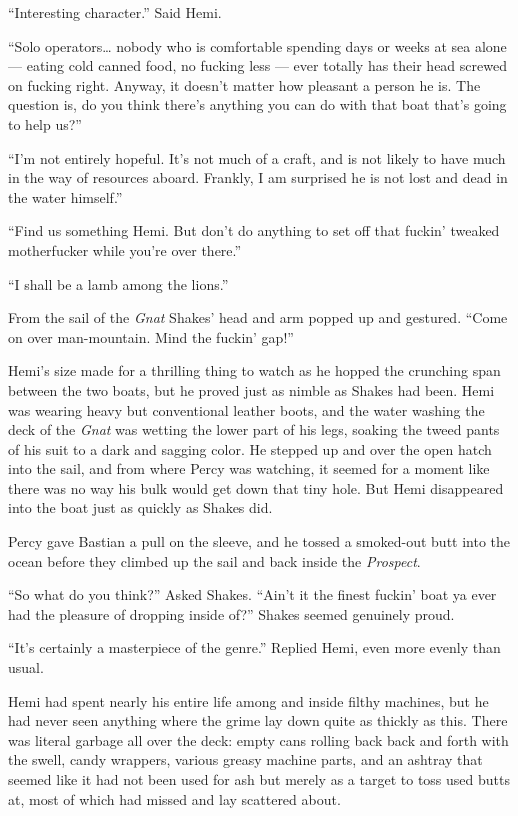 \documentclass[]{scrbook}
\begin{document}
``Interesting character.'' Said Hemi.

``Solo operators\ldots{} nobody who is comfortable spending days or
weeks at sea alone --- eating cold canned food, no fucking less --- ever
totally has their head screwed on fucking right. Anyway, it doesn't
matter how pleasant a person he is. The question is, do you think
there's anything you can do with that boat that's going to help us?''

``I'm not entirely hopeful. It's not much of a craft, and is not likely
to have much in the way of resources aboard. Frankly, I am surprised he
is not lost and dead in the water himself.''

``Find us something Hemi. But don't do anything to set off that fuckin'
tweaked motherfucker while you're over there.''

``I shall be a lamb among the lions.''

From the sail of the \emph{Gnat} Shakes' head and arm popped up and
gestured. ``Come on over man-mountain. Mind the fuckin' gap!''

Hemi's size made for a thrilling thing to watch as he hopped the
crunching span between the two boats, but he proved just as nimble as
Shakes had been. Hemi was wearing heavy but conventional leather boots,
and the water washing the deck of the \emph{Gnat} was wetting the lower
part of his legs, soaking the tweed pants of his suit to a dark and
sagging color. He stepped up and over the open hatch into the sail, and
from where Percy was watching, it seemed for a moment like there was no
way his bulk would get down that tiny hole. But Hemi disappeared into
the boat just as quickly as Shakes did.

Percy gave Bastian a pull on the sleeve, and he tossed a smoked-out butt
into the ocean before they climbed up the sail and back inside the
\emph{Prospect}.

``So what do you think?'' Asked Shakes. ``Ain't it the finest fuckin'
boat ya ever had the pleasure of dropping inside of?'' Shakes seemed
genuinely proud.

``It's certainly a masterpiece of the genre.'' Replied Hemi, even more
evenly than usual.

Hemi had spent nearly his entire life among and inside filthy machines,
but he had never seen anything where the grime lay down quite as thickly
as this. There was literal garbage all over the deck: empty cans rolling
back back and forth with the swell, candy wrappers, various greasy
machine parts, and an ashtray that seemed like it had not been used for
ash but merely as a target to toss used butts at, most of which had
missed and lay scattered about.
\end{document}
